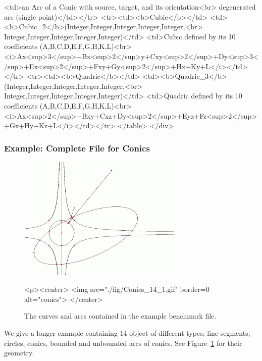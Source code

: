 \begin{ccHtmlOnly}
    <td>an Arc of a Conic with source, target, and its orientation<br>
        degenerated arc (single point)</td></tr>
<tr><td><b>Cubic</b></td>
    <td><b>Cubic_2</b>(Integer,Integer,Integer,Integer,Integer,<br>
                       Integer,Integer,Integer,Integer,Integer)</td>
    <td>Cubic defined by its 10 coefficients (A,B,C,D,E,F,G,H,K,L)<br>
        <i>Ax<sup>3</sup>+Bx<sup>2</sup>y+Cxy<sup>2</sup>+Dy<sup>3</sup>+Ex<sup>2</sup>+Fxy+Gy<sup>2</sup>+Hx+Ky+L</i></td></tr>
<tr><td><b>Quadric</b></td>
    <td><b>Quadric_3</b>(Integer,Integer,Integer,Integer,Integer,<br>
                         Integer,Integer,Integer,Integer,Integer)</td>
    <td>Quadric defined by its 10 coefficients (A,B,C,D,E,F,G,H,K,L)<br>
        <i>Ax<sup>2</sup>+Bxy+Cxz+Dy<sup>2</sup>+Eyz+Fz<sup>2</sup>+Gx+Hy+Kz+L</i></td></tr>
</table>
</div>
\end{ccHtmlOnly}

\subsubsection {Example: Complete File for Conics}
\label{longexample}

\begin{figure}
\begin{ccTexOnly}
\centerline{\includegraphics[width=0.7\textwidth]{Benchmark/fig/Conics_14_1}}
\end{ccTexOnly}
\begin{ccHtmlOnly}
  <p><center>
  <img src="./fig/Conics_14_1.gif" border=0 alt="conics">
  </center>
\end{ccHtmlOnly}
\caption{The curves and arcs contained in the example benchmark file.
  \label{fig:example}}
\end{figure}

We give a longer example containing 14 object of different types; line
segments, circles, conics, bounded and unbounded arcs of conics. See
Figure~\ref{fig:example} for their geometry.


